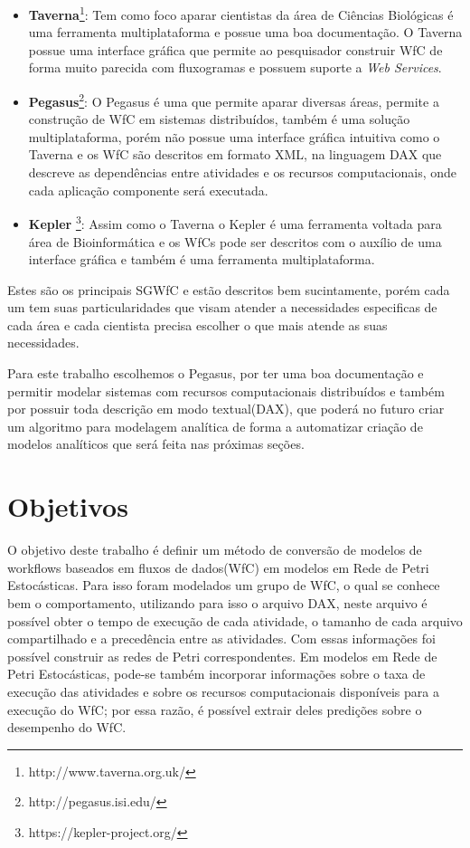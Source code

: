 \documentclass[a4paper,10pt]{article}
\begin{document}
	\begin{itemize}
	
		\item \textbf{Taverna}\footnote{http://www.taverna.org.uk/}: Tem como foco aparar cientistas da área de Ciências Biológicas é uma ferramenta multiplataforma e possue uma boa documentação. O Taverna possue uma interface gráfica que permite ao pesquisador construir WfC de forma muito parecida com fluxogramas e possuem suporte a \textit{Web Services}.

		\item \textbf{Pegasus}\footnote{http://pegasus.isi.edu/}: O Pegasus é uma que permite aparar diversas áreas, permite a construção de WfC em sistemas distribuídos, também é uma solução multiplataforma, porém não possue uma interface gráfica intuitiva como o Taverna e os WfC são descritos em formato XML, na linguagem DAX que descreve as dependências entre atividades e os recursos computacionais, onde cada aplicação componente será executada.

		\item \textbf{Kepler} \footnote{https://kepler-project.org/}: Assim como o Taverna o Kepler é uma ferramenta voltada para área de Bioinformática e os WfCs pode ser descritos com o auxílio de uma interface gráfica e também é uma ferramenta multiplataforma.

	\end{itemize}
	
	Estes são os principais SGWfC e estão descritos bem sucintamente, porém cada um tem suas particularidades que visam atender a necessidades especificas de cada área e cada cientista precisa escolher o que mais atende as suas necessidades. 

		Para este trabalho escolhemos o Pegasus, por ter uma boa documentação e permitir modelar sistemas com recursos computacionais distribuídos e também por possuir toda descrição em modo textual(DAX), que poderá no futuro criar um algoritmo para modelagem analítica de forma a automatizar criação de modelos analíticos que será feita nas próximas seções.

\section*{Objetivos}

O objetivo deste trabalho é definir um método de conversão de modelos de workflows baseados em fluxos de dados(WfC) em modelos em Rede de Petri Estocásticas. Para isso foram modelados um grupo de WfC, o qual se conhece bem o comportamento, utilizando para isso o arquivo DAX, neste arquivo é possível obter o tempo de execução de cada atividade, o tamanho de cada arquivo compartilhado e a precedência entre as atividades. Com essas informações foi possível construir as redes de Petri correspondentes. Em modelos em Rede de Petri Estocásticas, pode-se também incorporar informações sobre o taxa de execução das atividades e sobre os recursos computacionais disponíveis para a execução do WfC; por essa razão, é possível extrair deles predições sobre o desempenho do WfC.
\end{document}
